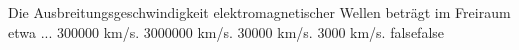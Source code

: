     {Die Ausbreitungsgeschwindigkeit elektromagnetischer Wellen beträgt im Freiraum etwa ...}
    {300000 km/s.}
    {3000000 km/s.}
    {30000 km/s.}
    {3000 km/s.}
    {false}{false}